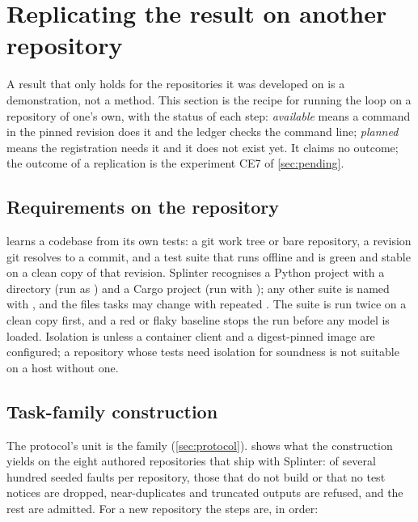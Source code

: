 
\section{Replicating the result on another repository}\label{sec:replicate}

A result that only holds for the repositories it was developed on is a demonstration, not a
method. This section is the recipe for running the loop on a repository of one's own, with
the status of each step: \emph{available} means a command in the pinned revision does it and
the ledger checks the command line; \emph{planned} means the registration needs it and it
does not exist yet. It claims no outcome; the outcome of a replication is the
experiment CE7 of \cref{sec:pending}.

\subsection{Requirements on the repository}

 learns a codebase from its own tests: a git work tree or bare
repository, a revision git resolves to a commit, and a test suite that runs offline and is
green and stable on a clean copy of that revision. Splinter recognises a Python project with
a  directory (run as ) and a Cargo project (run with
); any other suite is named with , and the files
tasks may change with repeated . The suite is run twice on a clean
copy first, and a red or flaky baseline stops the run before any model is loaded.
Isolation is  unless a container client and a digest-pinned image are configured;
a repository whose tests need isolation for soundness is not suitable on a host without
one.

\subsection{Task-family construction}

The protocol's unit is the family (\cref{sec:protocol}).  shows what the
construction yields on the eight authored repositories that ship with Splinter: of several
hundred seeded faults per repository, those that do not build or that no test notices are
dropped, near-duplicates and truncated outputs are refused, and the rest are admitted.
For a new repository the steps are, in order:

